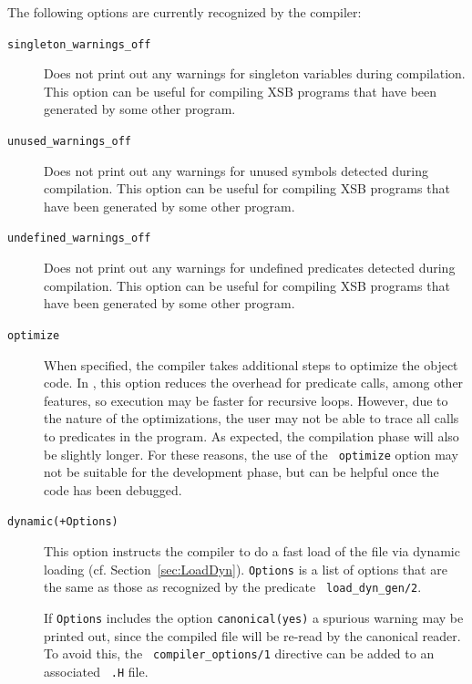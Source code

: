 The following options are currently recognized by the compiler:
\begin{description}
\item[{\tt singleton\_warnings\_off}] Does not print out any warnings
  for singleton variables during compilation.  This option can be
  useful for compiling XSB programs that have been generated by some
  other program.
%
\item[{\tt unused\_warnings\_off}] Does not print out any warnings for
  unused symbols detected during compilation.  This option can be
  useful for compiling XSB programs that have been generated by some
  other program.
%
\item[{\tt undefined\_warnings\_off}] Does not print out any warnings
  for undefined predicates detected during compilation.  This option
  can be useful for compiling XSB programs that have been generated by
  some other program.
\item[{\tt optimize}] When
  specified, the compiler takes additional steps to optimize the
  object code.  In \version, this option reduces the overhead for
  predicate calls, among other features, so execution may be faster
  for recursive loops.  However, due to the nature of the
  optimizations, the user may not be able to trace all calls to
  predicates in the program.  As expected, the compilation phase will
  also be slightly longer.  For these reasons, the use of the {\tt
    optimize} option may not be suitable for the development phase,
  but can be helpful once the code has been debugged.
\item[{\tt dynamic(+Options)}] This option instructs the compiler to
  do a fast load of the file via dynamic loading
  (cf. Section~\ref{sec:LoadDyn}).  {\tt Options} is a list of options
  that are the same as those as recognized by the predicate {\tt
    load\_dyn\_gen/2}.

  If {\tt Options} includes the option {\tt canonical(yes)} a spurious
  warning may be printed out, since the compiled file will be re-read
  by the canonical reader.  To avoid this, the {\tt
    compiler\_options/1} directive can be added to an associated {\tt
    .H} file.
  

\end{description}
